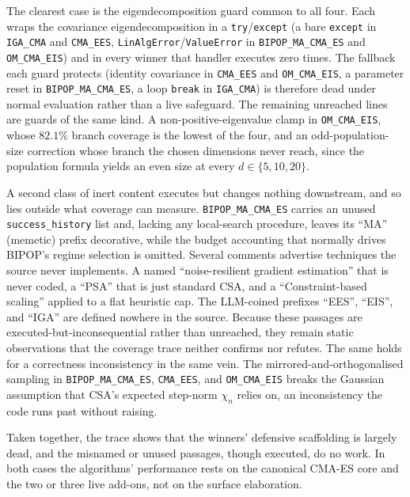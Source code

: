 The clearest case is the eigendecomposition guard common to all four. Each wraps the covariance eigendecomposition in a \texttt{try}/\texttt{except} (a bare \texttt{except} in \texttt{IGA\_CMA} and \texttt{CMA\_EES}, \texttt{LinAlgError}/\texttt{ValueError} in \texttt{BIPOP\_MA\_CMA\_ES} and \texttt{OM\_CMA\_EIS}) and in every winner that handler executes zero times. The fallback each guard protects (identity covariance in \texttt{CMA\_EES} and \texttt{OM\_CMA\_EIS}, a parameter reset in \texttt{BIPOP\_MA\_CMA\_ES}, a loop \texttt{break} in \texttt{IGA\_CMA}) is therefore dead under normal evaluation rather than a live safeguard. The remaining unreached lines are guards of the same kind. A non-positive-eigenvalue clamp in \texttt{OM\_CMA\_EIS}, whose $82.1\%$ branch coverage is the lowest of the four, and an odd-population-size correction whose branch the chosen dimensions never reach, since the population formula yields an even size at every $d \in \{5,10,20\}$. 

A second class of inert content executes but changes nothing downstream, and so lies outside what coverage can measure. \texttt{BIPOP\_MA\_CMA\_ES} carries an unused \texttt{success\_history} list and, lacking any local-search procedure, leaves its ``MA'' (memetic) prefix decorative, while the budget accounting that normally drives BIPOP's regime selection is omitted. Several comments advertise techniques the source never implements. A named ``noise-resilient gradient estimation'' that is never coded, a ``PSA'' that is just standard CSA, and a ``Constraint-based scaling'' applied to a flat heuristic cap. The LLM-coined prefixes ``EES'', ``EIS'', and ``IGA'' are defined nowhere in the source. Because these passages are executed-but-inconsequential rather than unreached, they remain static observations that the coverage trace neither confirms nor refutes. The same holds for a correctness inconsistency in the same vein. The mirrored-and-orthogonalised sampling in \texttt{BIPOP\_MA\_CMA\_ES}, \texttt{CMA\_EES}, and \texttt{OM\_CMA\_EIS} breaks the Gaussian assumption that CSA's expected step-norm $\chi_n$ relies on, an inconsistency the code runs past without raising.

Taken together, the trace shows that the winners' defensive scaffolding is largely dead, and the misnamed or unused passages, though executed, do no work. In both cases the algorithms' performance rests on the canonical CMA-ES core and the two or three live add-ons, not on the surface elaboration.


